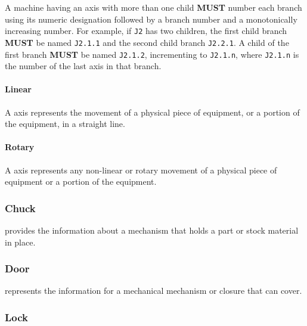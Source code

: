 A machine having an axis with more than one child \textbf{MUST} number each branch using its numeric designation followed by a branch number and a monotonically increasing number. For example, if \texttt{J2} has two children, the first child branch \textbf{MUST} be named \texttt{J2.1.1} and the second child branch \texttt{J2.2.1}. A child of the first branch \textbf{MUST} be named \texttt{J2.1.2}, incrementing to \texttt{J2.1.n}, where \texttt{J2.1.n} is the number of the last axis in that branch.

\paragraph{Linear}\mbox{}
\label{sec:Linear}


A  axis represents the movement of a physical piece of equipment, or a portion of the equipment, in a straight line. 



\paragraph{Rotary}\mbox{}
\label{sec:Rotary}


A  axis represents any non-linear or rotary movement of a physical piece of equipment or a portion of the equipment.



\subsubsection{Chuck}
\label{sec:Chuck}



 provides the information about a mechanism that holds a part or stock material in place.



\subsubsection{Door}
\label{sec:Door}



 represents the information for a mechanical mechanism or closure that can cover.



\subsubsection{Lock}
\label{sec:Lock}



